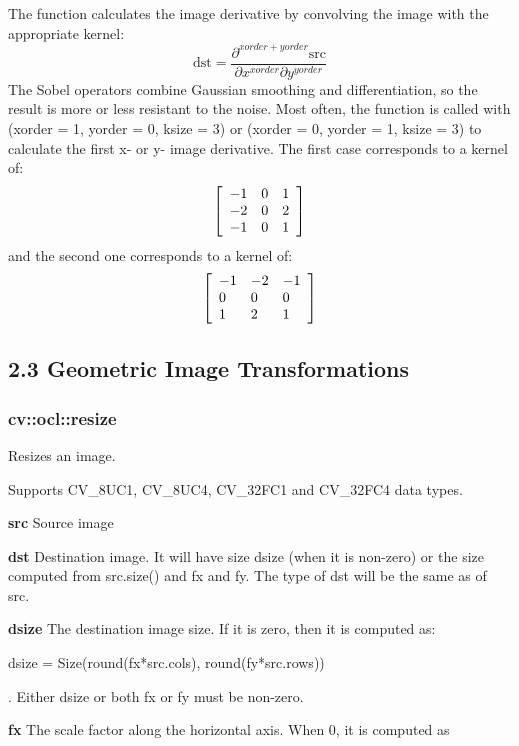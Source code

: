 \documentclass{article}
\begin{document}
The function calculates the image derivative by convolving the image with
the appropriate kernel:
\[
\mbox{dst}=\frac{\partial ^{xorder+yorder}\mbox{src}}{\partial
x^{xorder}\partial y^{yorder}}
\]
The Sobel operators combine Gaussian smoothing and differentiation, so the
result is more or less resistant to the noise. Most often, the function is
called with (xorder = 1, yorder = 0, ksize = 3) or (xorder = 0, yorder = 1,
ksize = 3) to calculate the first x- or y- image derivative. The first case
corresponds to a kernel of:
\[
\left[ {{\begin{array}{*{20}c}
 {-1} \hfill & 0 \hfill & 1 \hfill \\
 {-2} \hfill & 0 \hfill & 2 \hfill \\
 {-1} \hfill & 0 \hfill & 1 \hfill \\
\end{array} }} \right]
\]
and the second one corresponds to a kernel of:
\[
\left[ {{\begin{array}{*{20}c}
 {-1} \hfill & {-2} \hfill & {-1} \hfill \\
 0 \hfill & 0 \hfill & 0 \hfill \\
 1 \hfill & 2 \hfill & 1 \hfill \\
\end{array} }} \right]
\]
\newpage

\subsection{2.3 Geometric Image Transformations}
\label{subsec:mylabel5}
\subsubsection{cv::ocl::resize}
\label{subsubsec:mylabel45}
Resizes an image.

Supports CV{\_}8UC1, CV{\_}8UC4, CV{\_}32FC1 and CV{\_}32FC4 data types.

\textbf{src }Source image

\textbf{dst }Destination image. It will have size dsize (when it is
non-zero) or the size computed from src.size() and fx and fy. The type of
dst will be the same as of src.

\textbf{dsize }The destination image size. If it is zero, then it is
computed as:

dsize = Size(round(fx*src.cols), round(fy*src.rows))

. Either dsize or both fx or fy must be non-zero.

\textbf{fx }The scale factor along the horizontal axis. When 0, it is
computed as
\end{document}
